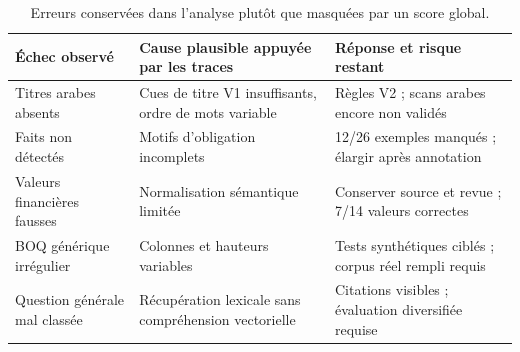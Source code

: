 \begin{table}[htbp]\centering\tighttable
\begin{tabularx}{\textwidth}{@{}p{30mm}Y Y@{}}\toprule
Échec observé & Cause plausible appuyée par les traces & Réponse et risque restant\\\midrule
Titres arabes absents & Cues de titre V1 insuffisants, ordre de mots variable & Règles V2 ; scans arabes encore non validés\\
Faits non détectés & Motifs d'obligation incomplets & 12/26 exemples manqués ; élargir après annotation\\
Valeurs financières fausses & Normalisation sémantique limitée & Conserver source et revue ; 7/14 valeurs correctes\\
BOQ générique irrégulier & Colonnes et hauteurs variables & Tests synthétiques ciblés ; corpus réel rempli requis\\
Question générale mal classée & Récupération lexicale sans compréhension vectorielle & Citations visibles ; évaluation diversifiée requise\\\bottomrule
\end{tabularx}
\caption{Erreurs conservées dans l'analyse plutôt que masquées par un score global.}\label{tab:erreurs}
\end{table}
